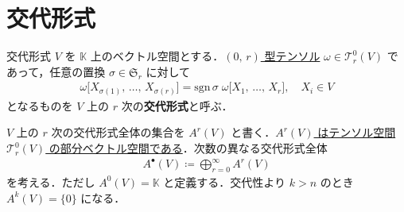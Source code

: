 \documentclass[geometry_main]{subfiles}
\begin{document}
\section{交代形式}

\begin{mydef}[label=def.anticom]{交代形式}
	$V$ を $\mathbb{K}$ 上のベクトル空間とする．\underline{$(0,\, r)$ 型テンソル} $ \omega \in \mathcal{T}_r^0 (V)$ であって，任意の置換  $ \sigma \in \mathfrak{S}_r$ に対して
	\begin{align}
		\omega \bigl[ X_{ \sigma(1) },\, \dots ,\, X_{ \sigma(r) } \bigr] = \mathrm{sgn}\, \sigma\; \omega \bigl[ X_1,\, \dots ,\, X_r \bigr],\quad X_i \in V
	\end{align}
	となるものを $V$ 上の $r$ 次の\textbf{交代形式}と呼ぶ．
\end{mydef}

$V$ 上の $r$ 次の交代形式全体の集合を $A^r(V)$ と書く．\underline{$A^r(V)$ はテンソル空間 $\mathcal{T}^0_r(V)$ の部分ベクトル空間である}．次数の異なる交代形式全体
\begin{align}
	A^\bullet (V) \coloneqq \bigoplus_{r = 0}^\infty A^r(V)
\end{align}
を考える．ただし $A^0(V) = \mathbb{K}$ と定義する．交代性より $k > n$ のとき $A^k(V) = \{ 0 \}$ になる．
\end{document}
